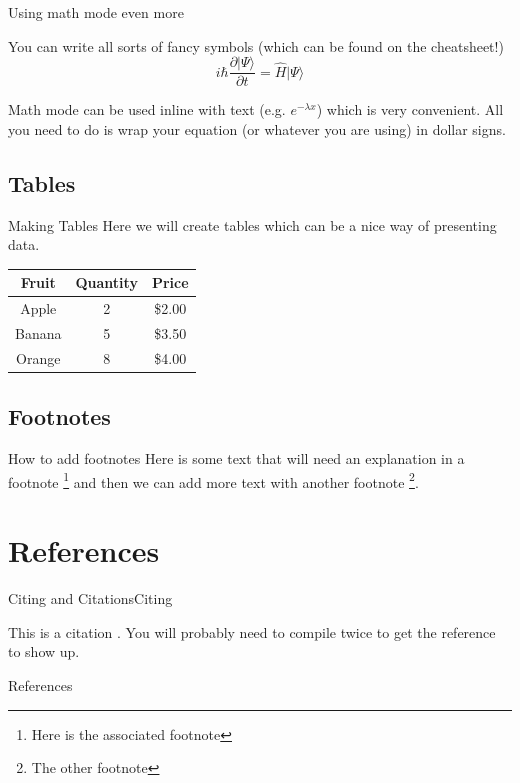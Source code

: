 \documentclass[xcolor={dvipsnames}]{beamer}
\begin{document}
\begin{frame}{Using math mode even more}

You can write all sorts of fancy symbols (which can be found on the cheatsheet!)
\begin{equation*}
i\hbar \frac{\partial | \Psi \rangle}{ \partial t}=\hat{H}|\Psi \rangle
\end{equation*}

Math mode can be used inline with text (e.g. $e^{-\lambda x}$) which is very 
convenient. All you need to do is wrap your equation (or whatever you are using)
in dollar signs.

\end{frame}


\subsection{Tables}
\begin{frame}{Making Tables}
Here we will create tables which can be a nice way of presenting data. 

\begin{center}
\begin{tabular} { c  c  c }
\toprule
Fruit & Quantity & Price \\ \midrule
Apple & 2 & \$2.00 \\ \midrule
Banana & 5 & \$3.50 \\ \midrule
Orange & 8 & \$4.00 \\ 
\bottomrule
\end{tabular}
\end{center}

\end{frame}

\subsection{Footnotes}

\begin{frame}{How to add footnotes}
Here is some text that will need an explanation in a footnote \footnote[frame]{\footnotesize{Here is the associated footnote}} and then we can add more text with another footnote \footnote[frame]{The other footnote}.
\end{frame}

\section{References}
\begin{frame}{Citing and Citations}{Citing}

This is a citation \cite{greenwade93}. You will probably need to compile 
twice to get the reference to show up. 
\end{frame}

\begin{frame}{References}




\end{frame}
\end{document}

